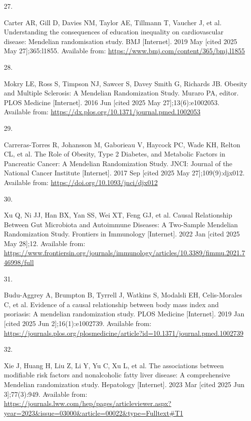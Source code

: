 \documentclass[
]{article}
\newlength{\cslhangindent}
\newlength{\csllabelwidth}
\newenvironment{CSLReferences}[2] %
 {\begin{list}{}{%
  \setlength{\itemindent}{0pt}
  \setlength{\leftmargin}{0pt}
  \setlength{\parsep}{0pt}
  \ifodd #1
   \setlength{\leftmargin}{\cslhangindent}
   \setlength{\itemindent}{-1\cslhangindent}
  \fi
  \setlength{\itemsep}{#2\baselineskip}}}
 {\end{list}}
\newcommand{\CSLLeftMargin}[1]{\parbox[t]{\csllabelwidth}{\strut#1\strut}}
\newcommand{\CSLRightInline}[1]{\parbox[t]{\linewidth - \csllabelwidth}{\strut#1\strut}}
\begin{document}
\begin{CSLReferences}{0}{1}
\CSLLeftMargin{27. }%
\CSLRightInline{Carter AR, Gill D, Davies NM, Taylor AE, Tillmann T, Vaucher J, et al. Understanding the consequences of education inequality on cardiovascular disease: Mendelian randomisation study. BMJ {[}Internet{]}. 2019 May {[}cited 2025 May 27{]};365:l1855. Available from: \url{https://www.bmj.com/content/365/bmj.l1855}}

\CSLLeftMargin{28. }%
\CSLRightInline{Mokry LE, Ross S, Timpson NJ, Sawcer S, Davey Smith G, Richards JB. Obesity and {Multiple} {Sclerosis}: {A} {Mendelian} {Randomization} {Study}. Muraro PA, editor. PLOS Medicine {[}Internet{]}. 2016 Jun {[}cited 2025 May 27{]};13(6):e1002053. Available from: \url{https://dx.plos.org/10.1371/journal.pmed.1002053}}

\CSLLeftMargin{29. }%
\CSLRightInline{Carreras-Torres R, Johansson M, Gaborieau V, Haycock PC, Wade KH, Relton CL, et al. The {Role} of {Obesity}, {Type} 2 {Diabetes}, and {Metabolic} {Factors} in {Pancreatic} {Cancer}: {A} {Mendelian} {Randomization} {Study}. JNCI: Journal of the National Cancer Institute {[}Internet{]}. 2017 Sep {[}cited 2025 May 27{]};109(9):djx012. Available from: \url{https://doi.org/10.1093/jnci/djx012}}

\CSLLeftMargin{30. }%
\CSLRightInline{Xu Q, Ni JJ, Han BX, Yan SS, Wei XT, Feng GJ, et al. Causal {Relationship} {Between} {Gut} {Microbiota} and {Autoimmune} {Diseases}: {A} {Two}-{Sample} {Mendelian} {Randomization} {Study}. Frontiers in Immunology {[}Internet{]}. 2022 Jan {[}cited 2025 May 28{]};12. Available from: \url{https://www.frontiersin.org/journals/immunology/articles/10.3389/fimmu.2021.746998/full}}

\CSLLeftMargin{31. }%
\CSLRightInline{Budu-Aggrey A, Brumpton B, Tyrrell J, Watkins S, Modalsli EH, Celis-Morales C, et al. Evidence of a causal relationship between body mass index and psoriasis: {A} mendelian randomization study. PLOS Medicine {[}Internet{]}. 2019 Jan {[}cited 2025 Jun 2{]};16(1):e1002739. Available from: \url{https://journals.plos.org/plosmedicine/article?id=10.1371/journal.pmed.1002739}}

\CSLLeftMargin{32. }%
\CSLRightInline{Xie J, Huang H, Liu Z, Li Y, Yu C, Xu L, et al. The associations between modifiable risk factors and nonalcoholic fatty liver disease: {A} comprehensive {Mendelian} randomization study. Hepatology {[}Internet{]}. 2023 Mar {[}cited 2025 Jun 3{]};77(3):949. Available from: \url{https://journals.lww.com/hep/pages/articleviewer.aspx?year=2023&issue=03000&article=00022&type=Fulltext\#T1}}


\end{CSLReferences}
\end{document}
